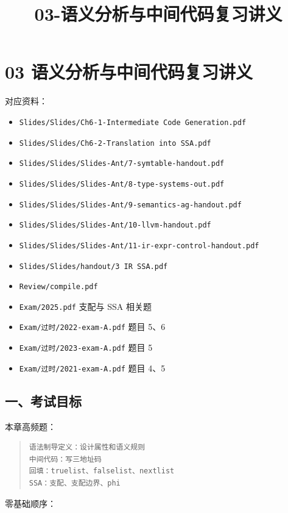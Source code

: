 \documentclass[UTF8,zihao=-4]{ctexart}
\title{03-语义分析与中间代码复习讲义}
\author{}
\date{}
\begin{document}
\maketitle
\setcounter{tocdepth}{1}
\tableofcontents
\newpage
\section{03 语义分析与中间代码复习讲义}


对应资料：


\begin{itemize}
\item \texttt{Slides/Slides/Ch6-1-Intermediate Code Generation.pdf}
\item \texttt{Slides/Slides/Ch6-2-Translation into SSA.pdf}
\item \texttt{Slides/Slides/Slides-Ant/7-symtable-handout.pdf}
\item \texttt{Slides/Slides/Slides-Ant/8-type-systems-out.pdf}
\item \texttt{Slides/Slides/Slides-Ant/9-semantics-ag-handout.pdf}
\item \texttt{Slides/Slides/Slides-Ant/10-llvm-handout.pdf}
\item \texttt{Slides/Slides/Slides-Ant/11-ir-expr-control-handout.pdf}
\item \texttt{Slides/Slides/handout/3 IR SSA.pdf}
\item \texttt{Review/compile.pdf}
\item \texttt{Exam/2025.pdf} 支配与 SSA 相关题
\item \texttt{Exam/过时/2022-exam-A.pdf} 题目 5、6
\item \texttt{Exam/过时/2023-exam-A.pdf} 题目 5
\item \texttt{Exam/过时/2021-exam-A.pdf} 题目 4、5
\end{itemize}


\subsection{一、考试目标}


本章高频题：


\begin{quote}
\footnotesize
\begin{verbatim}
语法制导定义：设计属性和语义规则
中间代码：写三地址码
回填：truelist、falselist、nextlist
SSA：支配、支配边界、phi
\end{verbatim}
\end{quote}


零基础顺序：
\end{document}

